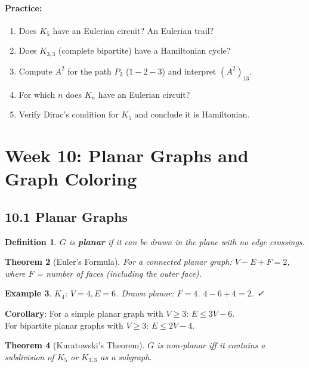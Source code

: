 \documentclass[11pt]{article}
\newtheorem{definition}{Definition}[section]
\newtheorem{example}[definition]{Example}
\newtheorem{theorem}[definition]{Theorem}
\newenvironment{practice}{\paragraph*{\textbf{Practice:}}}{}
\begin{document}
\begin{practice}
\begin{enumerate}[nosep,label=\arabic*.]
  \item Does $K_5$ have an Eulerian circuit? An Eulerian trail?
  \item Does $K_{3,3}$ (complete bipartite) have a Hamiltonian cycle?
  \item Compute $A^2$ for the path $P_3$ ($1{-}2{-}3$) and interpret $(A^2)_{13}$.
  \item For which $n$ does $K_n$ have an Eulerian circuit?
  \item Verify Dirac's condition for $K_5$ and conclude it is Hamiltonian.
\end{enumerate}
\end{practice}

\newpage
\section{Week 10: Planar Graphs and Graph Coloring}
\setcounter{definition}{0}

\subsection*{10.1 Planar Graphs}

\begin{definition}
$G$ is \textbf{planar} if it can be drawn in the plane with no edge crossings.
\end{definition}

\begin{theorem}[Euler's Formula]
For a connected planar graph: $V-E+F=2$, where $F$ = number of faces (including the outer face).
\end{theorem}

\begin{example}
$K_4$: $V=4,E=6$. Drawn planar: $F=4$. $4-6+4=2$. ✓
\end{example}

\textbf{Corollary}: For a simple planar graph with $V\ge3$: $E\le 3V-6$.\\
For bipartite planar graphs with $V\ge3$: $E\le 2V-4$.

\begin{theorem}[Kuratowski's Theorem]
$G$ is non-planar iff it contains a subdivision of $K_5$ or $K_{3,3}$ as a subgraph.
\end{theorem}
\end{document}
